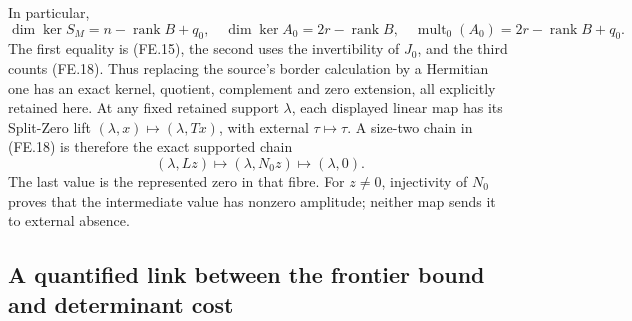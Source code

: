In particular,
\[
 \dim\ker S_M=n-\operatorname{rank}B+q_0,\quad
 \dim\ker A_0=2r-\operatorname{rank}B,
 \quad \operatorname{mult}_0(A_0)=2r-\operatorname{rank}B+q_0.
 \tag{FE.19}
\]
The first equality is (FE.15), the second uses the invertibility
of \(J_0\), and the third counts (FE.18).  Thus replacing the
source's border calculation by a Hermitian one has an exact
kernel, quotient, complement and zero extension, all explicitly
retained here.
At any fixed retained support \(\lambda\), each displayed
linear map has its Split-Zero lift
\((\lambda,x)\mapsto(\lambda,Tx)\), with external
\(\tau\mapsto\tau\).  A size-two chain in (FE.18) is
therefore the exact supported chain
\[
 (\lambda,Lz)\longmapsto(\lambda,N_0z)
                      \longmapsto(\lambda,0).
 \tag{FE.19a}
\]
The last value is the represented zero in that fibre.  For
\(z\ne0\), injectivity of \(N_0\) proves that the
intermediate value has nonzero amplitude; neither map sends
it to external absence.

\subsection{A quantified link between the frontier bound and determinant cost}

